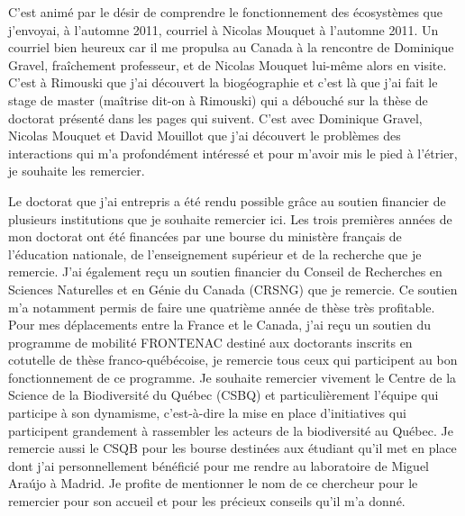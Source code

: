 C'est animé par le désir de comprendre le fonctionnement des écosystèmes
que j'envoyai, à l'automne 2011, courriel à Nicolas Mouquet à l'automne
2011. Un courriel bien heureux car il me propulsa au Canada à la
rencontre de Dominique Gravel, fraîchement professeur, et de Nicolas
Mouquet lui-même alors en visite. C'est à Rimouski que j'ai découvert la
biogéographie et c'est là que j'ai fait le stage de master (maîtrise
dit-on à Rimouski) qui a débouché sur la thèse de doctorat présenté dans
les pages qui suivent. C'est avec Dominique Gravel, Nicolas Mouquet et
David Mouillot que j'ai découvert le problèmes des interactions qui m'a
profondément intéressé et pour m'avoir mis le pied à l'étrier, je
souhaite les remercier.

Le doctorat que j'ai entrepris a été rendu possible grâce au soutien
financier de plusieurs institutions que je souhaite remercier ici. Les
trois premières années de mon doctorat ont été financées par une bourse
du ministère français de l'éducation nationale, de l'enseignement
supérieur et de la recherche que je remercie. J'ai également reçu un
soutien financier du Conseil de Recherches en Sciences Naturelles et en
Génie du Canada (CRSNG) que je remercie. Ce soutien m'a notamment permis
de faire une quatrième année de thèse très profitable. Pour mes
déplacements entre la France et le Canada, j'ai reçu un soutien du
programme de mobilité FRONTENAC destiné aux doctorants inscrits en
cotutelle de thèse franco-québécoise, je remercie tous ceux qui
participent au bon fonctionnement de ce programme. Je souhaite remercier
vivement le Centre de la Science de la Biodiversité du Québec (CSBQ) et
particulièrement l'équipe qui participe à son dynamisme, c'est-à-dire la
mise en place d'initiatives qui participent grandement à rassembler les
acteurs de la biodiversité au Québec. Je remercie aussi le CSQB pour les
bourse destinées aux étudiant qu'il met en place dont j'ai
personnellement bénéficié pour me rendre au laboratoire de Miguel Araújo
à Madrid. Je profite de mentionner le nom de ce chercheur pour le
remercier pour son accueil et pour les précieux conseils qu'il m'a
donné.

